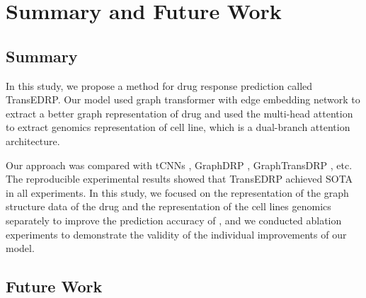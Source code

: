 \documentclass{article}
\begin{document}
\section{Summary and Future Work}

\subsection{Summary}
In this study, we propose a method for drug response prediction called TransEDRP. Our model used graph transformer with edge embedding network to extract a better graph representation of drug and used the multi-head attention to extract  genomics representation of cell line, which is a dual-branch attention architecture.

Our approach was compared with tCNNs \cite{tcnns}, GraphDRP \cite{110bGCNforDRP}, GraphTransDRP \cite{GraTransDRP}, etc. The reproducible experimental results showed that TransEDRP achieved SOTA in all experiments. In this study, we focused on the representation of the graph structure data of the drug and the representation of the cell lines genomics separately to improve the prediction accuracy of , and we conducted ablation experiments to demonstrate the validity of the individual improvements of our model.



\subsection{Future Work}
\end{document}
